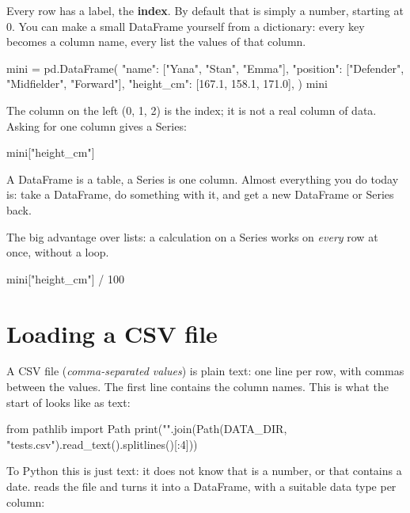 \documentclass[11pt,a4paper]{article}
\begin{document}
Every row has a label, the \textbf{index}. By default that is simply a
number, starting at 0. You can make a small DataFrame yourself from a
dictionary: every key becomes a column name, every list the values of
that column.

\begin{python}
mini = pd.DataFrame({
    "name": ["Yana", "Stan", "Emma"],
    "position": ["Defender", "Midfielder", "Forward"],
    "height_cm": [167.1, 158.1, 171.0],
})
mini
\end{python}

The column on the left (0, 1, 2) is the index; it is not a real column
of data. Asking for one column gives a Series:

\begin{python}
mini["height_cm"]
\end{python}

\begin{keyidea}
A DataFrame is a table, a Series is one column. Almost everything you
do today is: take a DataFrame, do something with it, and get a new
DataFrame or Series back.
\end{keyidea}

The big advantage over lists: a calculation on a Series works on
\emph{every} row at once, without a  loop.

\begin{python}
mini["height_cm"] / 100
\end{python}

\section{Loading a CSV file}

A CSV file (\emph{comma-separated values}) is plain text: one line per
row, with commas between the values. The first line contains the column
names. This is what the start of  looks like as text:

\begin{python}[outonly]
from pathlib import Path
print("\n".join(Path(DATA_DIR, "tests.csv").read_text().splitlines()[:4]))
\end{python}

To Python this is just text: it does not know that  is a
number, or that  contains a date.  reads
the file and turns it into a DataFrame, with a suitable data type per
column:
\end{document}
